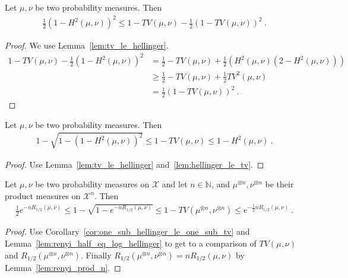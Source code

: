 \begin{corollary}
  \label{cor:one_sub_hellinger_squared_le_one_sub_tv}
  Let $\mu, \nu$ be two probability measures. Then
  \begin{align*}
  \frac{1}{2}(1 - H^2(\mu, \nu))^2 \le 1 - TV(\mu, \nu) - \frac{1}{2}(1 - TV(\mu, \nu))^2
  \: .
  \end{align*}
\end{corollary}

\begin{proof}
We use Lemma~\ref{lem:tv_le_hellinger}.
\begin{align*}
1 - TV(\mu, \nu) - \frac{1}{2}(1 - H^2(\mu, \nu))^2
&= \frac{1}{2} - TV(\mu, \nu) + \frac{1}{2}(H^2(\mu, \nu)(2 - H^2(\mu, \nu)))
\\
&\ge \frac{1}{2} - TV(\mu, \nu) + \frac{1}{2}TV^2(\mu, \nu)
\\
&= \frac{1}{2}(1 - TV(\mu, \nu))^2
\: .
\end{align*}
\end{proof}

\begin{corollary}
  \label{cor:one_sub_hellinger_le_one_sub_tv}
  Let $\mu, \nu$ be two probability measures. Then
  \begin{align*}
  1 - \sqrt{1 - (1 - H^2(\mu, \nu))^2} \le 1 - TV(\mu, \nu) \le 1 - H^2(\mu, \nu)
  \: .
  \end{align*}
\end{corollary}

\begin{proof}
Use Lemma~\ref{lem:tv_le_hellinger} and~\ref{lem:hellinger_le_tv}.
\end{proof}

\begin{corollary}
  \label{cor:one_sub_tv_bound_renyi}
  Let $\mu, \nu$ be two probability measures on $\mathcal X$ and let $n \in \mathbb{N}$, and $\mu^{\otimes n}, \nu^{\otimes n}$ be their product measures on $\mathcal X^n$. Then
  \begin{align*}
  \frac{1}{2}e^{-n R_{1/2}(\mu, \nu)} \le 1 - \sqrt{1 - e^{-n R_{1/2}(\mu, \nu)}} \le 1 - TV(\mu^{\otimes n}, \nu^{\otimes n}) \le e^{-\frac{1}{2} n R_{1/2}(\mu, \nu)}
  \: .
  \end{align*}
\end{corollary}

\begin{proof}
Use Corollary~\ref{cor:one_sub_hellinger_le_one_sub_tv} and Lemma~\ref{lem:renyi_half_eq_log_hellinger} to get to a comparison of $TV(\mu, \nu)$ and $R_{1/2}(\mu^{\otimes n}, \nu^{\otimes n})$. Finally $R_{1/2}(\mu^{\otimes n}, \nu^{\otimes n}) = n R_{1/2}(\mu, \nu)$ by Lemma~\ref{lem:renyi_prod_n}.
\end{proof}